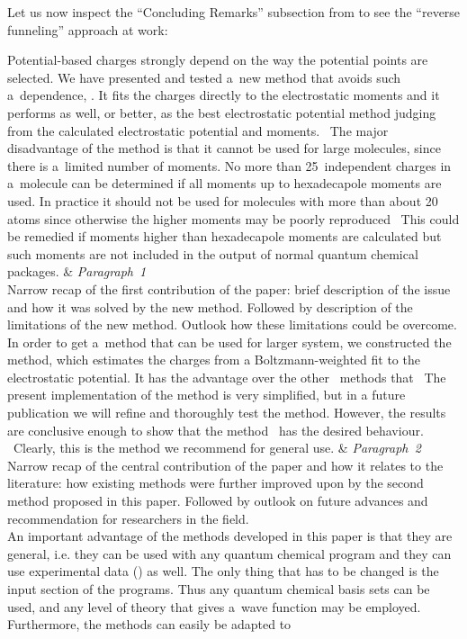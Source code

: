 \documentclass[11pt, a4paper, oneside]{article}
\newlength{\smalllinespacing}
\renewcommand{\caps}[1]{{\textscale{0.97}{\textls[50]{\MakeUppercase{#1}}}}}
\theoremstyle{Plain}
\theoremstyle{Definition}
\theoremstyle{Remark}
\begin{document}
Let us now inspect the ``Concluding Remarks'' subsection from \citet{sigfridsson} to see the ``reverse funneling'' approach at work:
\begin{longtblr}{}
	Potential-based charges strongly depend on the way the potential points are selected. We have presented and tested a~new method that avoids such a~dependence, \caps{CHELMO}. It fits the charges directly to the electrostatic moments and it performs as well, or better, as the best electrostatic potential method judging from the calculated electrostatic potential and moments. \textellipsis\ The major disadvantage of the method is that it cannot be used for large molecules, since there is a~limited number of moments. No more than 25~independent charges in a~molecule can be determined if all moments up to hexadecapole moments are used. In practice it should not be used for molecules with more than about 20 atoms since otherwise the higher moments may be poorly reproduced \textellipsis\ This could be remedied if moments higher than hexadecapole moments are calculated but such moments are not included in the output of normal quantum chemical packages.
	&
	{%
		\textit{Paragraph~1} \\
		Narrow recap of the first contribution of the paper: brief description of the issue and how it was solved by the new method. Followed by description of the limitations of the new method. Outlook how these limitations could be overcome.
	}
	\\
	\hspace{\smalllinespacing}In order to get a~method that can be used for larger system, we constructed the \caps{CHELP-BOW} method, which estimates the charges from a Boltzmann-weighted fit to the electrostatic potential. It has the advantage over the other \textellipsis\ methods that \textellipsis\ The present implementation of the \caps{CHELP-BOW} method is very simplified, but in a future publication we will refine and thoroughly test the method. However, the results are conclusive enough to show that the method \textellipsis\ has the desired behaviour. \textellipsis\ Clearly, this is the method we recommend for general use.
	&
	{%
		\textit{Paragraph~2} \\
		Narrow recap of the central contribution of the paper and how it relates to the literature: how existing methods were further improved upon by the second method proposed in this paper. Followed by outlook on future advances and recommendation for researchers in the field.
	}
	\\
	\hspace{\smalllinespacing}An important advantage of the methods developed in this paper is that they are general, i.e. they can be used with any quantum chemical program and they can use experimental data (\textellipsis\!) as well. The only thing that has to be changed is the input section of the programs. Thus any quantum chemical basis sets can be used, and any level of theory that gives a~wave function may be employed. Furthermore, the methods can easily be adapted to \textellipsis

\end{longtblr}
\end{document}
